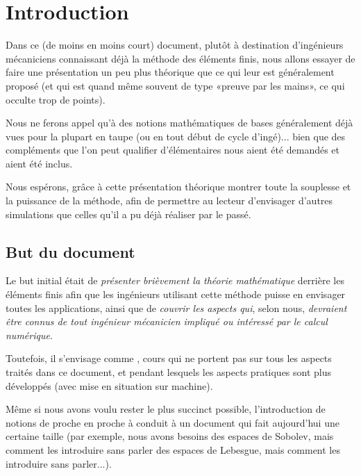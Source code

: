 \documentclass[11pt,pdflatex]{book}
\begin{document}
\chapter*{Introduction}
\ifVersionDuDocEstVincent\else{}\fi
{}

Dans ce (de moins en moins court) document, plutôt à destination d'ingénieurs
mécaniciens  connaissant déjà la méthode des éléments finis,
nous allons essayer de faire une présentation un peu plus théorique que ce qui 
leur est généralement proposé (et qui est quand même souvent de type 
«preuve par les mains», ce qui occulte trop de points).

Nous ne ferons appel qu'à des notions mathématiques de bases généralement 
déjà vues pour la plupart en taupe (ou en tout début de cycle d'ingé)... bien
que des compléments que l'on peut qualifier d'élémentaires nous aient été
demandés et aient été inclus.

Nous espérons, grâce à cette présentation théorique
montrer toute la souplesse et la puissance de la méthode, afin
de permettre au lecteur d'envisager d'autres simulations que celles
qu'il a pu déjà réaliser par le passé.





\bigskip
\section*{But du document}

Le but initial était de \emph{présenter brièvement la théorie mathématique} derrière
les éléments finis afin que les ingénieurs utilisant cette méthode puisse en envisager
toutes les applications, ainsi que de \emph{couvrir les aspects qui}, selon nous, \emph{devraient être
connus de tout ingénieur mécanicien impliqué ou intéressé par le calcul numérique}.

Toutefois, il s'envisage comme , 
cours qui ne portent pas sur tous les aspects traités dans ce document, et pendant lesquels les aspects 
pratiques sont plus développés (avec mise en situation sur machine).

\medskip
Même si nous avons voulu rester le plus succinct possible, l'introduction de
notions de proche en proche à conduit à un document qui fait aujourd'hui une
certaine taille (par exemple, nous avons besoins des espaces de Sobolev, mais
comment les introduire sans parler des espaces de Lebesgue, mais comment
les introduire sans parler...).
\end{document}
